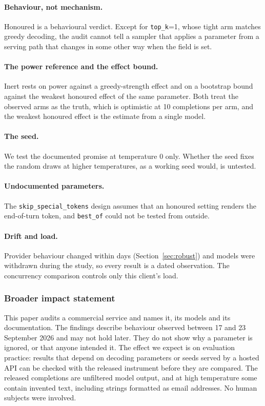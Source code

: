 \documentclass[10pt]{article}
\newcommand{\p}[1]{\texttt{#1}}
\begin{document}
\paragraph{Behaviour, not mechanism.} Honoured is a behavioural verdict. Except for \p{top\_k}=1, whose tight arm matches greedy decoding, the audit cannot tell a sampler that applies a parameter from a serving path that changes in some other way when the field is set.

\paragraph{The power reference and the effect bound.} Inert rests on power against a greedy-strength effect and on a bootstrap bound against the weakest honoured effect of the same parameter. Both treat the observed arms as the truth, which is optimistic at 10 completions per arm, and the weakest honoured effect is the estimate from a single model.

\paragraph{The seed.} We test the documented promise at temperature 0 only. Whether the seed fixes the random draws at higher temperatures, as a working seed would, is untested.

\paragraph{Undocumented parameters.} The \p{skip\_special\_tokens} design assumes that an honoured setting renders the end-of-turn token, and \p{best\_of} could not be tested from outside.

\paragraph{Drift and load.} Provider behaviour changed within days (Section~\ref{sec:robust}) and models were withdrawn during the study, so every result is a dated observation. The concurrency comparison controls only this client's load.

\subsubsection*{Broader impact statement}

This paper audits a commercial service and names it, its models and its documentation. The findings describe behaviour observed between 17 and 23 September 2026 and may not hold later. They do not show why a parameter is ignored, or that anyone intended it. The effect we expect is on evaluation practice: results that depend on decoding parameters or seeds served by a hosted API can be checked with the released instrument before they are compared. The released completions are unfiltered model output, and at high temperature some contain invented text, including strings formatted as email addresses. No human subjects were involved.
\end{document}
